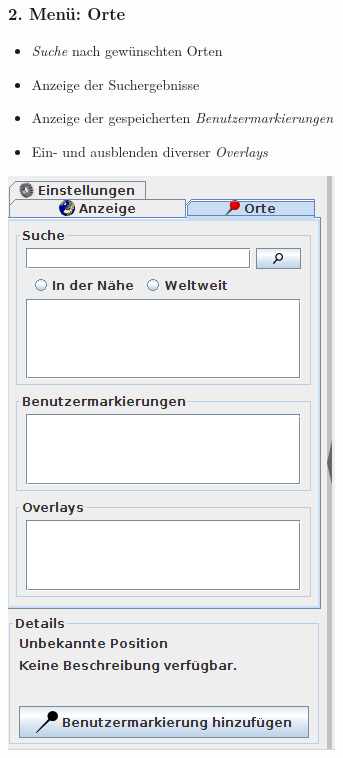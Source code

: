 \documentclass[10pt]{scrreprt}
\newcommand{\textref}[1]{\mbox{\raisebox{0.1ex}{\small$\rightarrow$ }\textit{#1}}}
\begin{document}
\vspace{3mm}
\subsubsection{2. Menü: Orte} 
\begin{minipage}[t]{9cm}
\vspace{-40mm}
	\begin{itemize}
	\item \textref{Suche} nach gewünschten Orten
	\item Anzeige der Suchergebnisse
	\item Anzeige der gespeicherten \textref{Benutzermarkierungen}
	\item Ein- und ausblenden diverser \textref{Overlays}
	\end{itemize}
\end{minipage}
\begin{minipage}{7cm}
\centering
\includegraphics[scale=0.4]{images/orte_tab.png}
\end{minipage}




\vspace{3mm}
\end{document}
